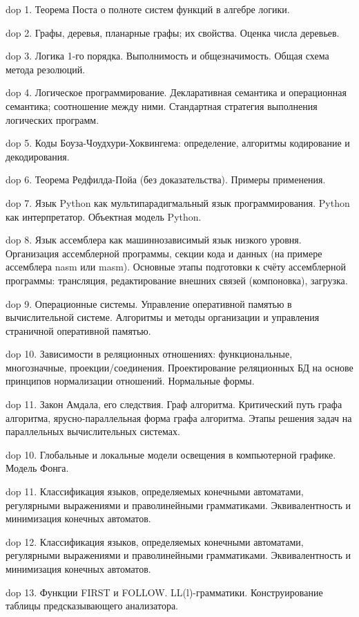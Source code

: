 dop 1. Теорема Поста о полноте систем функций в алгебре логики.

dop 2. Графы,  деревья,  планарные графы;  их свойства.  Оценка числа деревьев.

dop 3. Логика 1-го порядка.  Выполнимость и общезначимость. Общая схема метода резолюций.

dop 4. Логическое  программирование. Декларативная семантика и операционная семантика;  соотношение между ними.  Стандартная стратегия выполнения логических программ.

dop 5. Коды Боуза-Чоудхури-Хоквингема: определение, алгоритмы кодирование и декодирования.

dop 6. Теорема Редфилда-Пойа (без доказательства). Примеры применения.

dop 7. Язык Python как мультипарадигмальный язык программирования. Python как интерпретатор. Объектная модель Python.

dop 8. Язык ассемблера как машиннозависимый язык низкого уровня. Организация ассемблерной программы, секции кода и данных (на примере ассемблера nasm или masm). Основные этапы подготовки к счёту ассемблерной программы: трансляция, редактирование внешних связей (компоновка), загрузка.

dop 9. Операционные системы. Управление оперативной памятью в вычислительной системе. Алгоритмы и методы организации и управления страничной оперативной памятью.

dop 10. Зависимости  в  реляционных  отношениях:  функциональные,  многозначные,  проекции/соединения. Проектирование реляционных БД на основе принципов нормализации отношений. Нормальные формы.

dop 11. Закон Амдала, его следствия. Граф алгоритма. Критический путь графа алгоритма, ярусно-параллельная форма графа алгоритма. Этапы решения задач на параллельных вычислительных системах.

dop 10. Глобальные и локальные модели освещения в компьютерной графике. Модель Фонга.

dop 11. Классификация  языков,  определяемых  конечными  автоматами,  регулярными  выражениями  и праволинейными грамматиками. Эквивалентность и минимизация конечных автоматов.

dop 12. Классификация языков, определяемых конечными автоматами, регулярными выражениями и праволинейными грамматиками. Эквивалентность и минимизация конечных автоматов. 

dop 13. Функции FIRST и FOLLOW. LL(l)-грамматики. Конструирование таблицы предсказывающего анализатора.

